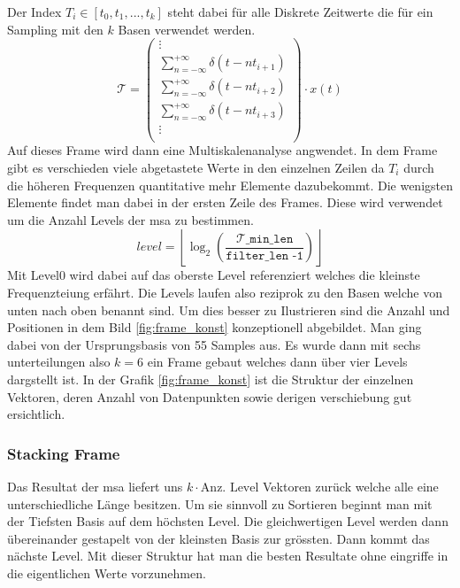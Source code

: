Der Index $T_{i}\in[t_{0},t_{1},...,t_{k}]$ steht dabei für alle Diskrete Zeitwerte die für ein Sampling mit den $k$ Basen verwendet werden.
\[
\mathcal{T}
=
\begin{pmatrix}
\vdots\\
\sum_{n=-\infty}^{+\infty} \delta(t - nt_{i+1})\\
\sum_{n=-\infty}^{+\infty} \delta(t - nt_{i+2})\\
\sum_{n=-\infty}^{+\infty} \delta(t - nt_{i+3})\\
\vdots\\
\end{pmatrix}
\cdot x(t)
\]
Auf dieses Frame wird dann eine Multiskalenanalyse angwendet. In dem Frame gibt es verschieden viele abgetastete Werte in den einzelnen Zeilen da $T_{i}$ durch die höheren Frequenzen quantitative mehr Elemente dazubekommt. Die wenigsten Elemente findet man dabei in der ersten Zeile des Frames. Diese wird verwendet um die Anzahl Levels der msa zu bestimmen. 
\[level = \left\lfloor\log_2\left(\mathtt{
	\frac{\mathcal{T}\_\text{min\_len}}{\text{filter\_len -1}}}\right)\right\rfloor
\]
Mit Level0 wird dabei auf das oberste Level referenziert welches die kleinste Frequenzteiung erfährt. Die Levels laufen also reziprok zu den Basen welche von unten nach oben benannt sind. Um dies besser zu Ilustrieren sind die Anzahl und Positionen in dem Bild \ref{fig:frame_konst} konzeptionell abgebildet. Man ging dabei von der Ursprungsbasis von 55 Samples aus. Es wurde dann mit sechs unterteilungen also $k=6$ ein Frame gebaut welches dann über vier Levels dargstellt ist. In der Grafik \ref{fig:frame_konst} ist die Struktur der einzelnen Vektoren, deren Anzahl von Datenpunkten sowie derigen verschiebung gut ersichtlich. \\

\subsubsection{Stacking Frame} 
Das Resultat der msa liefert uns $k\cdot \text{Anz. Level}$ Vektoren zurück welche alle eine unterschiedliche Länge besitzen. Um sie sinnvoll zu Sortieren beginnt man mit der Tiefsten Basis auf dem höchsten Level. Die gleichwertigen Level werden dann übereinander gestapelt von der kleinsten Basis zur grössten. Dann kommt das nächste Level. Mit dieser Struktur hat man die besten Resultate ohne eingriffe in die eigentlichen Werte vorzunehmen. 


